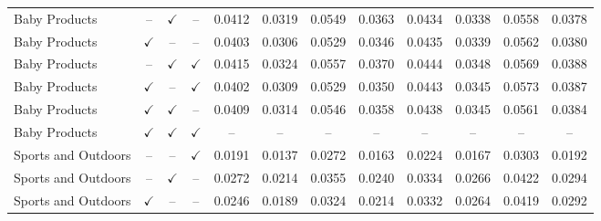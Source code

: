\documentclass[11pt]{article}
\begin{document}
\begin{table}[!t]
{\begin{tabular}{lccc|cccc|cccc}
Baby Products & -- & $\checkmark$ & -- & 0.0412 & 0.0319 & 0.0549 & 0.0363 & 0.0434 & 0.0338 & 0.0558 & 0.0378\\
Baby Products & $\checkmark$ & -- & -- & 0.0403 & 0.0306 & 0.0529 & 0.0346 & 0.0435 & 0.0339 & 0.0562 & 0.0380\\
Baby Products & -- & $\checkmark$ & $\checkmark$ & 0.0415 & 0.0324 & 0.0557 & 0.0370 & 0.0444 & 0.0348 & 0.0569 & 0.0388\\
Baby Products & $\checkmark$ & -- & $\checkmark$ & 0.0402 & 0.0309 & 0.0529 & 0.0350 & 0.0443 & 0.0345 & 0.0573 & 0.0387\\
Baby Products & $\checkmark$ & $\checkmark$ & -- & 0.0409 & 0.0314 & 0.0546 & 0.0358 & 0.0438 & 0.0345 & 0.0561 & 0.0384\\
Baby Products & $\checkmark$ & $\checkmark$ & $\checkmark$ & -- & -- & -- & -- & -- & -- & -- & --\\
\midrule
Sports and Outdoors & -- & -- & $\checkmark$ & 0.0191 & 0.0137 & 0.0272 & 0.0163 & 0.0224 & 0.0167 & 0.0303 & 0.0192\\
Sports and Outdoors & -- & $\checkmark$ & -- & 0.0272 & 0.0214 & 0.0355 & 0.0240 & 0.0334 & 0.0266 & 0.0422 & 0.0294\\
Sports and Outdoors & $\checkmark$ & -- & -- & 0.0246 & 0.0189 & 0.0324 & 0.0214 & 0.0332 & 0.0264 & 0.0419 & 0.0292\\

\end{tabular}}
\end{table}
\end{document}
